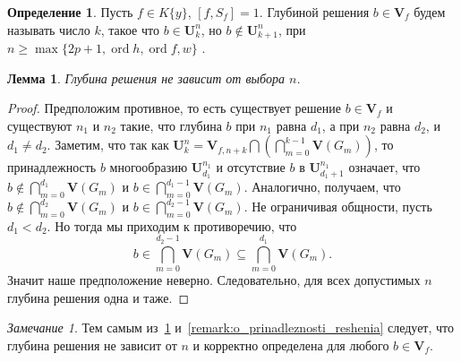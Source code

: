 \documentclass[16pt]{article}
\DeclareMathOperator{\ord}{ord}
\theoremstyle{plain}
\newtheorem{lemma}[theorem]{Лемма}
\theoremstyle{definition}
\newtheorem{definition}[theorem]{Определение}
\theoremstyle{remark}
\newtheorem{remark}[theorem]{Замечание}
\begin{document}
\begin{definition}
Пусть $f\in K\{y\}$, $[f,S_f]=1$.  Глубиной решения $b\in \mathbf{V}_f$  будем называть число $k$, такое что $b\in \mathbf{U}_k^n$, но $b\not\in \mathbf{U}_{k+1}^n$, при $n \geqslant\max\{ 2p+1,\ord{h},\ord{f},w\}$ .
\end{definition}



\begin{lemma}\label{lemma:o_nasledovanii}
Глубина решения не зависит от выбора $n$.

\end{lemma}

\begin{proof}
Предположим противное, то есть существует решение $b\in\mathbf{V}_f$ и существуют $n_1$ и $n_2$ такие, что  глубина $b$ при $n_1$  равна $d_1$, а при $n_2$ равна $d_2$, и $d_1\not=d_2$. Заметим, что так как $\mathbf{U}_k^n=\mathbf{V}_{f,n+k}\bigcap\left(\bigcap\limits_{m=0}^{k-1}\mathbf{V}\left(G_m\right)\right)$, то принадлежность $b$  многообразию $\mathbf{U}_{d_1}^{n_1}$ и отсутствие $b$ в $\mathbf{U}_{d_1+1}^{n_1}$ означает, что $b\not\in\bigcap\limits_{m=0}^{d_1}\mathbf{V}\left(G_m\right)$ и $b\in\bigcap\limits_{m=0}^{d_1-1}\mathbf{V}\left(G_m\right)$. Аналогично, получаем, что $b\not\in\bigcap\limits_{m=0}^{d_2}\mathbf{V}\left(G_m\right)$ и $b\in\bigcap\limits_{m=0}^{d_2-1}\mathbf{V}\left(G_m\right)$. Не ограничивая общности, пусть $d_1<d_2$. Но тогда мы приходим к противоречию, что 
$$
b\in\bigcap\limits_{m=0}^{d_2-1}\mathbf{V}\left(G_m\right)\subseteq\bigcap\limits_{m=0}^{d_1}\mathbf{V}\left(G_m\right).
$$
Значит наше предположение неверно. Следовательно, для всех  допустимых $n$ глубина решения одна и таже.

\end{proof}

\begin{remark}\label{remark:o_sushestvovanii_gllubiny} Тем самым из~\ref{lemma:o_nasledovanii} и~\ref{remark:o_prinadleznosti_reshenia} следует, что глубина решения не зависит от $n$ и корректно определена для любого $b\in \mathbf{V}_f$.
\end{remark}
\end{document}
